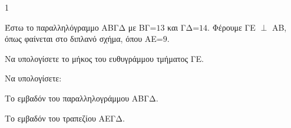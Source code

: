 \begin{ylh}{1}
    \item [Ύλη από εικόνα]
\end{ylh}
\begin{figure} %
\centering
{}
\end{figure}
Έστω το παραλληλόγραμμο ΑΒΓΔ με ΒΓ=$13$ και ΓΔ=$14$. Φέρουμε ΓΕ $\perp$ ΑΒ, όπως φαίνεται στο διπλανό σχήμα, όπου ΑΕ=$9$.
\begin{alist}
    \item Να υπολογίσετε το μήκος του ευθυγράμμου τμήματος ΓΕ. 
    \item Να υπολογίσετε:
    \begin{rlist}
        \item Το εμβαδόν του παραλληλογράμμου ΑΒΓΔ. 
        \item Το εμβαδόν του τραπεζίου ΑΕΓΔ. 
    \end{rlist}
\end{alist}